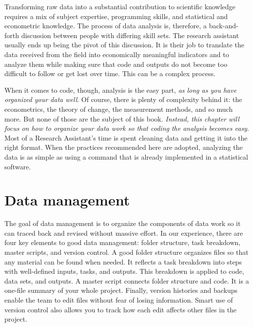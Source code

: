 
\begin{fullwidth}
Transforming raw data into a substantial contribution to scientific knowledge 
requires a mix of subject expertise, programming skills, 
and statistical and econometric knowledge. 
The process of data analysis is, therefore, 
a back-and-forth discussion between people 
with differing skill sets. 
The research assistant usually ends up being the pivot of this discussion. 
It is their job to translate the data received from the field into
economically meaningful indicators and to analyze them 
while making sure that code and outputs do not become too difficult to follow or get lost over time.
This can be a complex process.

When it comes to code, though, analysis is the easy part, 
\textit{as long as you have organized your data well}. 
Of course, there is plenty of complexity behind it: 
the econometrics, the theory of change, the measurement methods, and so much more.
But none of those are the subject of this book. 
\textit{Instead, this chapter will focus on how to organize your data work so that coding the analysis becomes easy}.
Most of a Research Assistant's time is spent cleaning data and getting it into the right format. 
When the practices recommended here are adopted,
analyzing the data is as simple as using a command that is already implemented in a statistical software. 


\end{fullwidth}


\section{Data management}

The goal of data management is to organize the components of data work 
so it can traced back and revised without massive effort.
In our experience, there are four key elements to good data management: 
folder structure, task breakdown, master scripts, and version control. 
A good folder structure organizes files so that any material can be found when needed.
It reflects a task breakdown into steps with well-defined inputs, tasks, and outputs.
This breakdown is applied to code, data sets, and outputs.
A master script connects folder structure and code.
It is a one-file summary of your whole project.
Finally, version histories and backups enable the team 
to edit files without fear of losing information.
Smart use of version control also allows you to track 
how each edit affects other files in the project.

